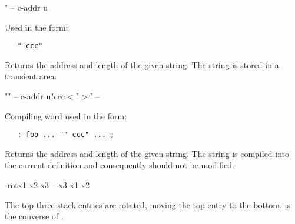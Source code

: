\begin{gloss}{"}{ -- c-addr u}

Used in the form:
\begin{verbatim}
   " ccc"
\end{verbatim}
Returns the address and length of the given string.  The string is stored
in a transient area.
\end{gloss}
\begin{cgloss}{""}{ -- c-addr u}{"ccc$<$"$>$" -- }

Compiling word used in the form:
\begin{verbatim}
   : foo ... "" ccc" ... ;
\end{verbatim}
Returns the address and length of the given string.  The string is compiled
into the current definition and consequently should not be modified.
\end{cgloss}
\begin{gloss}{-rot}{x1 x2 x3 -- x3 x1 x2}

The top three stack entries are rotated, moving the top entry to the
bottom.   is the converse of .
\end{gloss}
